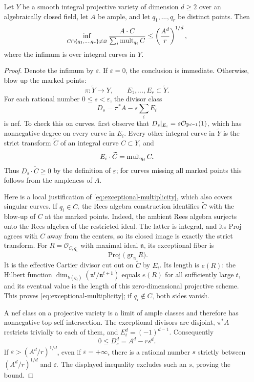 \begin{lemma}\label{lem:volume-bound}
Let $Y$ be a smooth integral projective variety of dimension $d\geq2$ over an
algebraically closed field, let $A$ be ample, and let $q_1,\ldots,q_r$ be
distinct points.  Then
\[
 \inf_{C\cap\{q_1,\ldots,q_r\}\ne\varnothing}
 \frac{A\cdot C}{\sum_i\operatorname{mult}_{q_i}C}
 \leq \left(\frac{A^d}{r}\right)^{1/d},
\]
where the infimum is over integral curves in $Y$.
\end{lemma}

\begin{proof}
Denote the infimum by $\varepsilon$.  If $\varepsilon=0$, the conclusion
is immediate.  Otherwise, blow up the marked points:
\[
 \pi:\widetilde Y\longrightarrow Y,
 \qquad E_1,\ldots,E_r\subset\widetilde Y.
\]
For each rational number $0\leq s<\varepsilon$, the divisor class
\[
 D_s=\pi^*A-s\sum_i E_i
\]
is nef.  To check this on curves, first observe that
$D_s|_{E_i}=s\mathcal O_{\mathbb P^{d-1}}(1)$, which has nonnegative degree on every
curve in $E_i$.  Every other integral curve in $\widetilde Y$ is the strict
transform $\widetilde C$ of an integral curve $C\subset Y$, and
\begin{equation}\label{eq:exceptional-multiplicity}
 E_i\cdot\widetilde C=\operatorname{mult}_{q_i}C.
\end{equation}
Thus $D_s\cdot\widetilde C\geq0$ by the definition of $\varepsilon$; for curves
missing all marked points this follows from the ampleness of $A$.

Here is a local justification of \eqref{eq:exceptional-multiplicity}, which
also covers singular curves.  If $q_i\in C$, the Rees algebra construction
identifies $\widetilde C$ with the blow-up of $C$ at the marked points.
Indeed, the ambient Rees algebra surjects onto the Rees algebra of the
restricted ideal.  The latter is integral, and its Proj agrees with $C$
away from the centers, so its closed image is exactly the strict transform.
For
$R=\mathcal O_{C,q_i}$ with maximal ideal $\mathfrak n$, its exceptional fiber
is
\[
 \operatorname{Proj}\bigl(\operatorname{gr}_{\mathfrak n}R\bigr).
\]
It is the effective Cartier divisor cut out on $\widetilde C$ by $E_i$.
Its length is $e(R)$: the Hilbert function
$\dim_{k(q_i)}(\mathfrak n^t/\mathfrak n^{t+1})$ equals $e(R)$ for all
sufficiently large $t$, and its eventual value is the length of this
zero-dimensional projective scheme.  This proves
\eqref{eq:exceptional-multiplicity}; if $q_i\notin C$, both sides vanish.

A nef class on a projective variety is a limit of ample classes and therefore
has nonnegative top self-intersection.  The exceptional divisors are
disjoint, $\pi^*A$ restricts trivially to each of them, and
$E_i^d=(-1)^{d-1}$.  Consequently
\[
 0\leq D_s^d=A^d-rs^d.
\]
If $\varepsilon>(A^d/r)^{1/d}$, even if $\varepsilon=+\infty$, there is a
rational number $s$ strictly between $(A^d/r)^{1/d}$ and $\varepsilon$.
The displayed inequality excludes such an $s$, proving the bound.
\end{proof}

